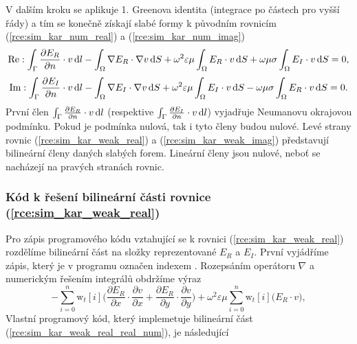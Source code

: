 V dalším kroku se aplikuje 1. Greenova identita \cite[příloha A.2]{num} (integrace po částech pro vyšší řády) a tím se konečně získají slabé formy k původním rovnicím (\ref{rce:sim_kar_num_real}) a (\ref{rce:sim_kar_num_imag})
\begin{equation}
	\mathrm{Re} : \int_{\Gamma}\frac{\partial E_R}{\partial n}\cdot v\,\mathrm{d} l-\int_{\Omega}\nabla E_R\cdot\nabla v \,\mathrm{d} S + \omega^{2}\varepsilon\mu\int_{\Omega} E_R\cdot v\,\mathrm{d} S + \omega\mu\sigma\int_{\Omega} E_I\cdot v\,\mathrm{d} S = 0,
	\label{rce:sim_kar_weak_real} 
\end{equation}
\begin{equation}
	\mathrm{Im} : \int_{\Gamma}\frac{\partial E_I}{\partial n}\cdot v\,\mathrm{d} l-\int_{\Omega}\nabla E_I\cdot\nabla v\,\mathrm{d} S + \omega^{2}\varepsilon\mu\int_{\Omega} E_I\cdot v\,\mathrm{d} S - \omega\mu\sigma\int_{\Omega} E_R\cdot v\,\mathrm{d} S = 0.
	\label{rce:sim_kar_weak_imag} 
\end{equation}
První člen $\int_{\Gamma}\frac{\partial E_R}{\partial n}\cdot v\,\mathrm{d} l$ (respektive $\int_{\Gamma}\frac{\partial E_I}{\partial n}\cdot v\,\mathrm{d} l$) vyjadřuje Neumanovu okrajovou podmínku. Pokud je podmínka nulová, tak i tyto členy budou nulové. Levé strany rovnic (\ref{rce:sim_kar_weak_real}) a (\ref{rce:sim_kar_weak_imag}) představují bilineární členy daných slabých forem. Lineární členy jsou nulové, neboť se nacházejí na pravých stranách rovnic. 

\subsubsection*{Kód k řešení bilineární části rovnice (\ref{rce:sim_kar_weak_real})}
Pro zápis programového kódu vztahující se k rovnici (\ref{rce:sim_kar_weak_real}) rozdělíme bilineární část na složky reprezentované $E_{R}$ a $E_{I}$. První vyjádříme zápis, který je v programu označen indexem . Rozepsáním operátoru $\nabla$ a numerickým řešením integrálů obdržíme výraz
\begin{equation}
	-\sum_{i=0}^{n}\mathrm{w}_{t}[i]\bigg(\frac{\partial E_R}{\partial x}\cdot \frac{\partial v}{\partial x} + \frac{\partial E_R}{\partial y}\cdot \frac{\partial v}{\partial y} \bigg) + \omega^{2}\varepsilon\mu\sum_{i=0}^{n}\mathrm{w}_{t}[i]\bigg(E_R\cdot v\bigg),
	\label{rce:sim_kar_weak_real_real_num} 
\end{equation}
Vlastní programový kód, který implemetuje bilineární část (\ref{rce:sim_kar_weak_real_real_num}), je následující

